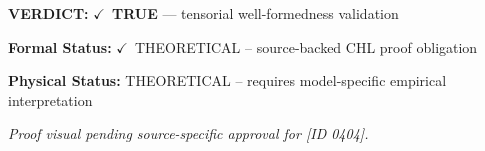 \textbf{VERDICT:} \ensuremath{\checkmark}\ \textbf{TRUE} --- tensorial well-formedness validation

\textbf{Formal Status:} \ensuremath{\checkmark}\ THEORETICAL -- source-backed CHL proof obligation

\textbf{Physical Status:} THEORETICAL -- requires model-specific empirical interpretation
\par\vspace{0.45em}
\par
\vfill
\begingroup\footnotesize\itshape
Proof visual pending source-specific approval for [ID 0404].
\par\endgroup
\vfill
\endgroup
\endgroup

